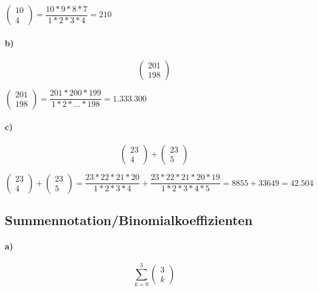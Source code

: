 \documentclass[paper=a4, fontsize=11pt]{scrartcl}
\numberwithin{equation}{section}
\numberwithin{figure}{section}
\numberwithin{table}{section}
\begin{document}
$\left(\begin{array}{c} 10 \\ 4 \end{array}\right) 
= \dfrac{10*9*8*7}{1*2*3*4}
= 210$
\paragraph{b)}
$$\left(\begin{array}{c} 201 \\ 198 \end{array}\right)$$

$\left(\begin{array}{c} 201 \\ 198 \end{array}\right) 
= \dfrac{201*200*199}{1*2* ... * 198}
= 1.333.300$
\paragraph{c)}
$$\left(\begin{array}{c} 23 \\ 4 \end{array}\right)+\left(\begin{array}{c} 23 \\ 5 \end{array}\right)$$

$\left(\begin{array}{c} 23 \\ 4 \end{array}\right)+\left(\begin{array}{c} 23 \\ 5 \end{array}\right)
= \dfrac{23*22*21*20}{1*2*3*4}
+ \dfrac{23*22*21*20*19}{1*2*3*4*5}
=8855+33649 = 42.504$
\subsection{Summennotation/Binomialkoeffizienten}
\paragraph{a)}
$$\sum^{3}_{k=0} \left(\begin{array}{c} 3 \\ k \end{array}\right)$$

\end{document}
